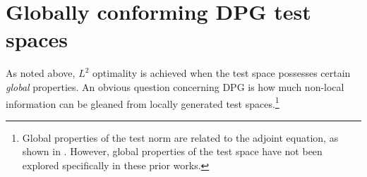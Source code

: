 \documentclass[11pt,onecolumn]{scrartcl}
\newcommand{\LRp}[1]{\left( #1 \right)}
\newcommand{\LRs}[1]{\left[ #1 \right]}
\newcommand{\LRa}[1]{\left\langle #1 \right\rangle}
\newcommand{\jump}[1] {\ensuremath{\LRs{\!\left[#1\right]\!}}}
\newcommand{\uh}{\widehat{u}}
\newcommand{\Gh}{\Gamma_h}
\begin{document}

\section{Globally conforming DPG test spaces}

As noted above, $L^2$ optimality is achieved when the test space possesses certain \textit{global} properties.  An obvious question concerning DPG is how much non-local information can be gleaned from locally generated test spaces.\footnote{Global properties of the test norm are related to the adjoint equation, as shown in \cite{DPGrobustness, ChanHeuerBui-ThanhDemkowicz12}.  However, global properties of the test space have not been explored specifically in these prior works.}
\end{document}
